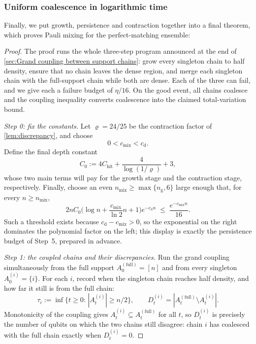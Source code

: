 \documentclass[
    aps,
    superscriptaddress,
    onecolumn,
    10pt,
    prx,
    nofootinbib
]{revtex4-2}
\theoremstyle{namedstatement}
\theoremstyle{plain}
\begin{document}
\subsubsection{Uniform coalescence in logarithmic time}
Finally, we put growth, persistence and contraction together into a final theorem, which proves Pauli mixing for the perfect-matching ensemble:

\paulimixing*

\begin{proof}
The proof runs the whole three-step program announced at the end of \cref{sec:Grand coupling between support chains}: grow every singleton chain to half density, ensure that no chain leaves the dense region, and merge each singleton chain with the full-support chain while both are dense.
Each of the three can fail, and we give each a failure budget of $\eta/16$. On the good event, all chains coalesce and the coupling inequality converts coalescence into the claimed total-variation bound.
 
\medskip\noindent\emph{Step 0: fix the constants.}
Let $\varrho=24/25$ be the contraction factor of \cref{lem:discrepancy}, and choose
\begin{equation}
  0<c_{\mathrm{mix}}<c_{\mathrm d}.
\end{equation}
Define the final depth constant
\begin{equation}\label{eq:C0}
  C_0:=4C_{\mathrm{hit}}+\frac{4}{\log(1/\varrho)}+3,
\end{equation}
whose two main terms will pay for the growth stage and the contraction stage, respectively. Finally, choose an even $n_{\mathrm{mix}}\ge\max\{n_{\mathrm g},6\}$ large enough that, for every $n\ge n_{\mathrm{mix}}$,
\begin{equation}\label{eq:nmix-cond}
  2nC_0\Big(\log n+\frac{c_{\mathrm{mix}}}{\ln2}n+1\Big)e^{-c_{\mathrm d}n}
  \;\le\;\frac{e^{-c_{\mathrm{mix}}n}}{16}.
\end{equation}
Such a threshold exists because $c_{\mathrm d}-c_{\mathrm{mix}}>0$, so the exponential on the right dominates the polynomial factor on the left; this display is exactly the persistence budget of Step~5, prepared in advance.
 
\medskip\noindent\emph{Step 1: the coupled chains and their discrepancies.}
Run the grand coupling simultaneously from the full support $A_0^{(\mathrm{full})}=[n]$ and from every singleton $A_0^{(i)}=\{i\}$. For each $i$, record when the singleton chain reaches half density, and how far it still is from the full chain:
\begin{equation}
  \tau_i:=\inf\{t\geq 0:\,|A_t^{(i)}|\ge n/2\},
  \qquad
  D_t^{(i)}=|A_t^{(\mathrm{full})}\setminus A_t^{(i)}|.
\end{equation}
Monotonicity of the coupling gives $A_t^{(i)}\subseteq A_t^{(\mathrm{full})}$ for all $t$, so $D_t^{(i)}$ is precisely the number of qubits on which the two chains still disagree: chain $i$ has coalesced with the full chain exactly when $D_t^{(i)}=0$.
 

\end{proof}
\end{document}
